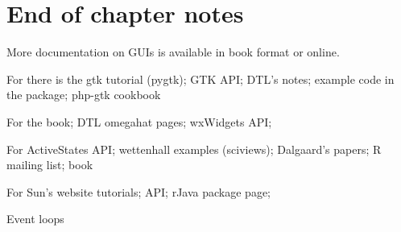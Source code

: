 




\section{End of chapter notes}
\label{sec:GUI:end-of-chapter}

More documentation on GUIs is available in book format or online. 

For \GTK\/ there is the gtk tutorial (pygtk); GTK API; DTL's notes; example
code in the  package; php-gtk cookbook

For \wxWidgets the book; DTL omegahat pages; wxWidgets API;

For \tcltk\/ ActiveStates API; wettenhall examples (sciviews);
Dalgaard's papers; R mailing list; book

For \Java\/ Sun's website tutorials; API; rJava package page; 

Event loops





